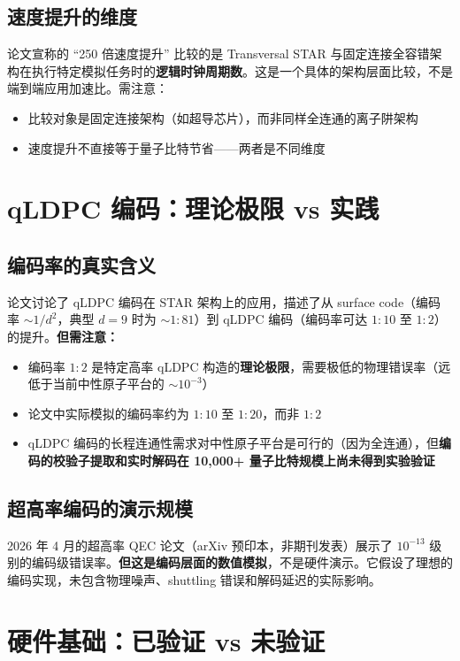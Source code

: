 \documentclass[11pt,a4paper]{ctexart}
\begin{document}
\subsection{速度提升的维度}

论文宣称的 ``250 倍速度提升'' 比较的是 Transversal STAR 与固定连接全容错架构在执行特定模拟任务时的\textbf{逻辑时钟周期数}。这是一个具体的架构层面比较，不是端到端应用加速比。需注意：
\begin{itemize}
\item 比较对象是固定连接架构（如超导芯片），而非同样全连通的离子阱架构
\item 速度提升不直接等于量子比特节省——两者是不同维度
\end{itemize}

\section{qLDPC 编码：理论极限 vs 实践}

\subsection{编码率的真实含义}

论文讨论了 qLDPC 编码在 STAR 架构上的应用，描述了从 surface code（编码率 $\sim 1/d^2$，典型 $d=9$ 时为 $\sim 1:81$）到 qLDPC 编码（编码率可达 $1:10$ 至 $1:2$）的提升。\textbf{但需注意：}

\begin{itemize}
\item 编码率 $1:2$ 是特定高率 qLDPC 构造的\textbf{理论极限}，需要极低的物理错误率（远低于当前中性原子平台的 $\sim 10^{-3}$）
\item 论文中实际模拟的编码率约为 $1:10$ 至 $1:20$，而非 $1:2$
\item qLDPC 编码的长程连通性需求对中性原子平台是可行的（因为全连通），但\textbf{编码的校验子提取和实时解码在 10,000+ 量子比特规模上尚未得到实验验证}
\end{itemize}

\subsection{超高率编码的演示规模}

2026 年 4 月的超高率 QEC 论文（arXiv 预印本，非期刊发表）展示了 $10^{-13}$ 级别的编码级错误率。\textbf{但这是编码层面的数值模拟}，不是硬件演示。它假设了理想的编码实现，未包含物理噪声、shuttling 错误和解码延迟的实际影响。

\section{硬件基础：已验证 vs 未验证}
\end{document}

